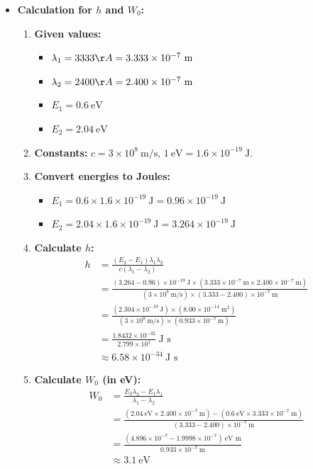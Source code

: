 \documentclass[12pt]{article}
\begin{document}
\begin{itemize}
    \item \textbf{Calculation for $h$ and $W_0$:}
    \begin{enumerate}[label=\alph*.]
        \item \textbf{Given values:}
        \begin{itemize}
            \item $\lambda_1=3333 \AA =3.333\times 10^{-7}\ \text{m}$
            \item $\lambda_2=2400 \AA =2.400\times 10^{-7}\ \text{m}$
            \item $E_1=0.6\ \text{eV}$
            \item $E_2=2.04\ \text{eV}$
        \end{itemize}
        \item \textbf{Constants:} $c=3\times 10^8\ \text{m/s}$, $1\ \text{eV}=1.6\times 10^{-19}\ \text{J}$.
        \item \textbf{Convert energies to Joules:}
        \begin{itemize}
            \item $E_1=0.6\times 1.6\times 10^{-19}\ \text{J}=0.96\times 10^{-19}\ \text{J}$
            \item $E_2=2.04\times 1.6\times 10^{-19}\ \text{J}=3.264\times 10^{-19}\ \text{J}$
        \end{itemize}
        \item \textbf{Calculate $h$:}
        \begin{align*}
            h&=\frac{(E_2-E_1)\lambda_1\lambda_2}{c(\lambda_1-\lambda_2)}\\
             &=\frac{(3.264-0.96)\times 10^{-19}\ \text{J}\times(3.333\times 10^{-7}\ \text{m}\times 2.400\times 10^{-7}\ \text{m})}{(3\times 10^8\ \text{m/s})\times(3.333-2.400)\times 10^{-7}\ \text{m}}\\
             &=\frac{(2.304\times 10^{-19}\ \text{J})\times(8.00\times 10^{-14}\ \text{m}^2)}{(3\times 10^8\ \text{m/s})\times(0.933\times 10^{-7}\ \text{m})}\\
             &=\frac{1.8432\times 10^{-32}}{2.799\times 10^{1}}\ \text{J s}\\
             &\approx 6.58\times 10^{-34}\ \text{J s}
        \end{align*}
        \item \textbf{Calculate $W_0$ (in eV):}
        \begin{align*}
            W_0&=\frac{E_2\lambda_2-E_1\lambda_1}{\lambda_1-\lambda_2}\\
               &=\frac{(2.04\ \text{eV}\times 2.400\times 10^{-7}\ \text{m})-(0.6\ \text{eV}\times 3.333\times 10^{-7}\ \text{m})}{(3.333-2.400)\times 10^{-7}\ \text{m}}\\
               &=\frac{(4.896\times 10^{-7}-1.9998\times 10^{-7})\ \text{eV m}}{0.933\times 10^{-7}\ \text{m}}\\
               &\approx 3.1\ \text{eV}
        \end{align*}
    \end{enumerate}
\end{itemize}
\end{document}
